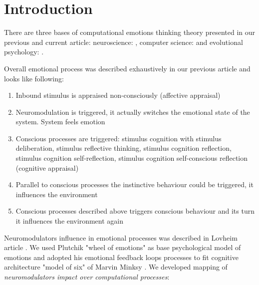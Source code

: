 \section{Introduction}

There are three bases of computational emotions thinking theory presented in our previous \cite{computational_emotional_thinking} and current article: neuroscience: \cite{emotionsbraintorobot, parsingreward, neuromodulatory, cubeofemotions, natureofemotions}, computer science: \cite{emotionandsociable, senticcomputing, hourglass, affectivemodelofinterplay, affectivecomputing, computationalmodelsemotion, computationalmodelsemotionscognition, evaluatingcomutationalmodel, threelevel} and evolutional psychology: \cite{natureofemotions, primer_affect_psychology, tomkins1, tomkins2, tomkins3, quest}.

Overall emotional process was described exhaustively in our previous article \cite{computational_emotional_thinking} and looks like following:

\begin{enumerate}
	\item  Inbound stimulus is appraised non-consciously (affective appraisal)
	\item  Neuromodulation is triggered, it actually switches the emotional state of the system. System feels emotion
	\item  Conscious processes are triggered: stimulus cognition with stimulus deliberation, stimulus reflective thinking, stimulus cognition reflection, stimulus cognition self-reflection, stimulus cognition self-conscious reflection (cognitive appraisal)
	\item  Parallel to conscious processes the instinctive behaviour could be triggered, it influences the environment
	\item  Conscious processes described above triggers conscious behaviour and its turn it influences the environment again
\end{enumerate}

Neuromodulators influence in emotional processes was described in Lovheim article \cite{cubeofemotions}. We used Plutchik "wheel of emotions" as base psychological model of emotions \cite{natureofemotions} and adopted his emotional feedback loops processes to fit cognitive architecture "model of six" of Marvin Minksy \cite{emotionmachine}. We developed mapping of \emph{neuromodulators impact over computational processes}:

